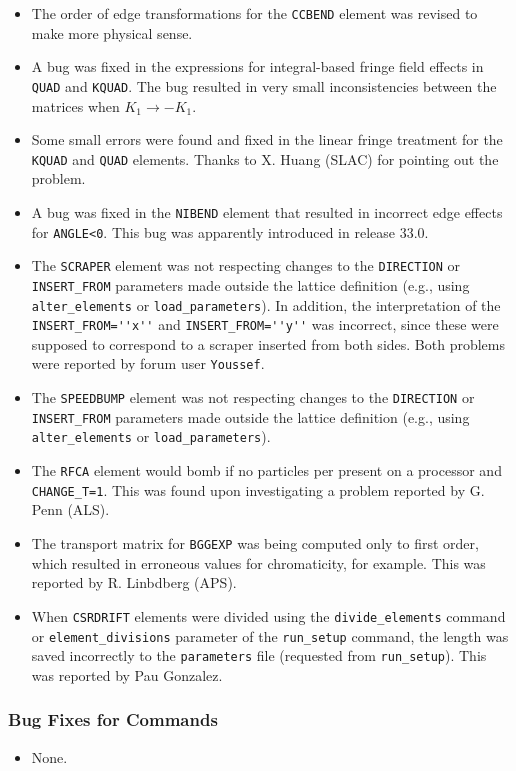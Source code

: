 \documentclass[11pt]{article}
\begin{document}
\begin{itemize}
\item The order of edge transformations for the \verb|CCBEND| element was revised to make more physical sense.
\item A bug was fixed in the expressions for integral-based fringe field effects in \verb|QUAD| and \verb|KQUAD|.
  The bug resulted in very small inconsistencies between the matrices when $K_1 \rightarrow -K_1$.
\item Some small errors were found and fixed in the linear fringe treatment for the \verb|KQUAD| and \verb|QUAD| elements.
  Thanks to X. Huang (SLAC) for pointing out the problem.
\item A bug was fixed in the \verb|NIBEND| element that resulted in incorrect edge effects for \verb|ANGLE<0|.
  This bug was apparently introduced in release 33.0.
\item The \verb|SCRAPER| element was not respecting changes to the \verb|DIRECTION| or \verb|INSERT_FROM| parameters 
  made outside the lattice definition (e.g., using \verb|alter_elements| or \verb|load_parameters|). In addition,
  the interpretation of the \verb|INSERT_FROM=''x''| and \verb|INSERT_FROM=''y''| was incorrect, since these were
  supposed to correspond to a scraper inserted from both sides. Both problems were reported by forum user 
  \verb|Youssef|.
\item The \verb|SPEEDBUMP| element was not respecting changes to the \verb|DIRECTION| or \verb|INSERT_FROM| parameters 
  made outside the lattice definition (e.g., using \verb|alter_elements| or \verb|load_parameters|).
\item The \verb|RFCA| element would bomb if no particles per present on a processor and \verb|CHANGE_T=1|. This
  was found upon investigating a problem reported by G. Penn (ALS).
\item The transport matrix for \verb|BGGEXP| was being computed only to first order, which resulted in erroneous
  values for chromaticity, for example. This was reported by R. Linbdberg (APS).
\item When \verb|CSRDRIFT| elements were divided using the \verb|divide_elements| command or \verb|element_divisions|
  parameter of the \verb|run_setup| command, the length was saved incorrectly to the \verb|parameters| file (requested
  from \verb|run_setup|). This was reported by Pau Gonzalez.
\end{itemize}

\subsubsection{Bug Fixes for Commands}
\begin{itemize}
\item None.
\end{itemize}
\end{document}
